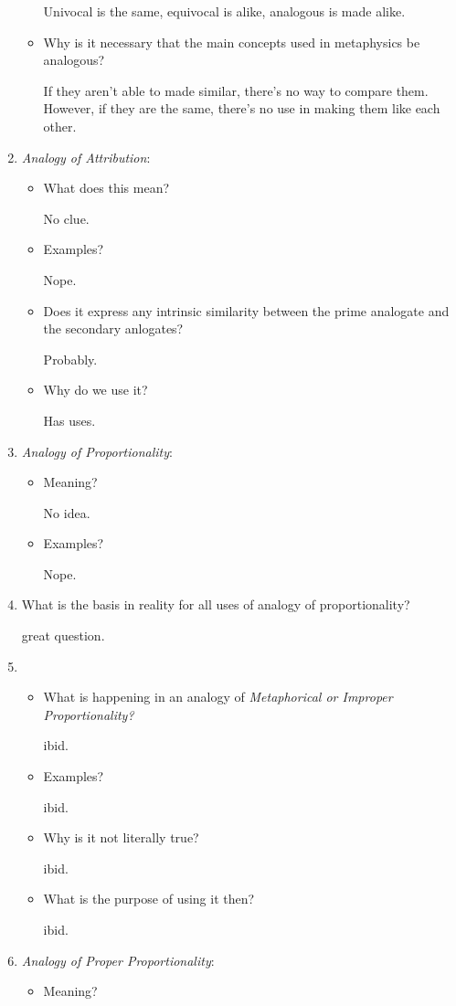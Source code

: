 \documentclass[12pt]{article}[titlepage]
\newcommand{\1}{\={a}}
\newcommand{\2}{\={e}}
\newcommand{\3}{\={\i}}
\newcommand{\4}{\=o}
\newcommand{\5}{\=u}
\newcommand{\6}{\={A}}
\renewcommand{\,}{\textsuperscript{,}}
\begin{document}
\begin{enumerate}
\begin{itemize}
Univocal is the same, equivocal is alike, analogous is made alike.
\item Why is it necessary that the main concepts used in metaphysics be analogous?

If they aren't able to made similar, there's no way to compare them.
However, if they are the same, there's no use in making them like each other.
\end{itemize}
\item \emph{Analogy of Attribution}:
\begin{itemize}
\item What does this mean?

No clue.
\item Examples?

Nope.
\item Does it express any intrinsic similarity between the prime analogate and the secondary anlogates?

Probably.
\item Why do we use it?

Has uses.
\end{itemize}
\item \emph{Analogy of Proportionality}:
\begin{itemize}
\item Meaning?

No idea.
\item Examples?

Nope.
\end{itemize}
\item What is the basis in reality for all uses of analogy of proportionality?

great question.
\item \begin{itemize}
\item What is happening in an analogy of \emph{Metaphorical or Improper Proportionality?}

ibid.
\item Examples?

ibid.
\item Why is it not literally true?

ibid.
\item What is the purpose of using it then?

ibid.
\end{itemize}
\item \emph{Analogy of Proper Proportionality}:
\begin{itemize}
\item Meaning?


\end{itemize}
\end{enumerate}
\end{document}

